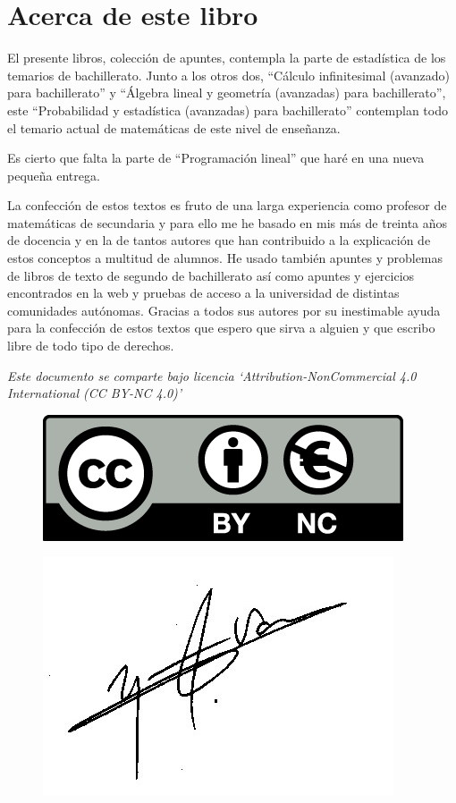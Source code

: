 \section{Acerca de este libro}

El presente libros, colección de apuntes, contempla la parte de estadística de los temarios de bachillerato. Junto a los otros dos, ``Cálculo infinitesimal (avanzado) para bachillerato'' y ``Álgebra lineal y geometría (avanzadas) para bachillerato'', este ``Probabilidad y estadística (avanzadas) para bachillerato'' contemplan todo el temario actual de matemáticas de este nivel de enseñanza.

Es cierto que falta la parte de ``Programación lineal'' que haré en una nueva pequeña entrega.

La confección de estos textos es fruto de una larga experiencia como profesor de matemáticas de secundaria y para ello me he basado en mis más de treinta años de docencia  y en la de tantos autores que han contribuido a la explicación de estos conceptos a multitud de alumnos. He usado también apuntes y problemas de libros de texto de segundo de bachillerato así como apuntes y ejercicios encontrados en la web y pruebas de acceso a la universidad de distintas comunidades autónomas. Gracias a todos sus autores por su inestimable ayuda para la confección de estos textos que espero que sirva a alguien y que escribo libre de todo tipo de derechos. 


\vspace{5mm}
\justify

\emph{Este documento se comparte bajo licencia `Attribution-NonCommercial 4.0 International (CC BY-NC 4.0)'}


\begin{multicols}{2}
\begin{figure}[H]
	\centering
	\includegraphics[width=.4
	\textwidth]{imagenes/imagenes00/licencia.png}
\end{figure}
\begin{figure}[H]
	\centering
	\includegraphics[width=.3
	\textwidth]{imagenes/firma.png}
\end{figure}
\end{multicols}





